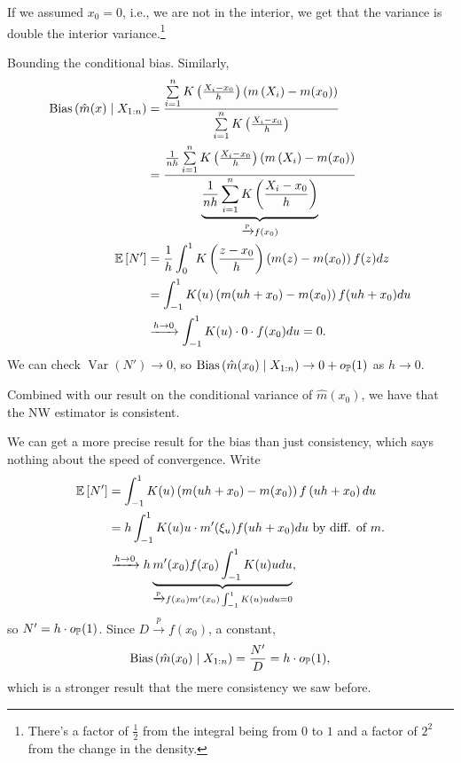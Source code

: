 If we assumed $x_0 = 0$, i.e., we are not in the interior, we get that the variance is double the interior variance.\footnote{There's a factor of $\frac{1}{2}$ from the integral being from $0$ to $1$ and a factor of $2^2$ from the change in the density.}

Bounding the conditional bias.
Similarly,
\begin{align*}
	\operatorname{Bias}\left(\hat{m}(x) \mid X_{1:n}\right) &= \frac{\sum\limits_{i=1}^{n} K\left( \frac{X_i - x_0}{h}\right) \left( m\left( X_i \right) - m(x_0) \right)}{\sum\limits_{i=1}^{n} K\left( \frac{X_i - x_0}{h} \right)} \\
					&= \frac{\frac{1}{nh}\sum\limits_{i=1}^{n} K\left( \frac{X_i - x_0}{h} \right)\left( m\left( X_i \right) - m(x_0) \right)}{ \underbrace{\frac{1}{nh}\sum\limits_{i=1}^{n} K\left( \frac{X_i - x_0}{h} \right)}_{\xrightarrow{p} f(x_0)}} \\
				\E\left[N'\right] &= \frac{1}{h} \int_{0}^{1} K\left( \frac{z-x_0}{h} \right) \left( m(z) - m(x_0) \right) f(z)dz \\
					  &= \int_{-1}^{1} K(u) \left( m(uh + x_0) - m(x_0) \right)f(uh + x_0)du \\ 
					  &\xrightarrow{h\to 0} \int_{-1}^{1} K(u) \cdot 0 \cdot f(x_0)du = 0 
.\end{align*}
We can check $\operatorname{Var}\left(N'\right) \to 0$, so $\operatorname{Bias}\left(\hat{m}(x_0) \mid X_{1:n}\right) \to 0 + o_{\P}(1)$ as $h \to 0$.

Combined with our result on the conditional variance of $\hat{m}(x_0)$, we have that the NW estimator is consistent.

We can get a more precise result for the bias than just consistency, which says nothing about the speed of convergence.
Write
\begin{align*}
	\E\left[N'\right] &= \int_{-1}^{1} K(u) \left( m(uh+x_0) - m(x_0) \right) f\left( uh + x_0 \right)du  \\
					  &= h \int_{-1}^{1} K(u) u \cdot m'(\xi_u) f(uh+x_0)du \text{ by diff. of $m$.} \\
					  &\xrightarrow{h \to 0} h \underbrace{m'(x_0) f(x_0) \int_{-1}^{1} K(u) u du}_{\xrightarrow{p} f(x_0) m'(x_0) \int_{-1}^{1} K(u)u du = 0 }
,\end{align*}
so $N' = h \cdot o_\P(1)$. Since $D \xrightarrow{p} f(x_0)$, a constant, \[
	\operatorname{Bias}\left(\hat{m}(x_0) \mid X_{1:n}\right) = \frac{N'}{D} = h \cdot o_\P(1)
,\] 
which is a stronger result that the mere consistency we saw before.

